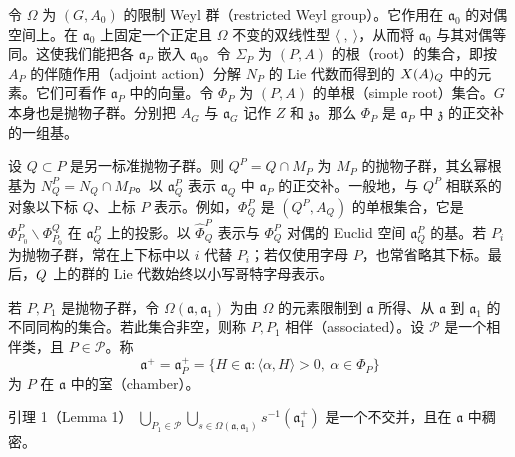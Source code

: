 令 $\Omega$ 为 $(G,A_0)$ 的限制 Weyl 群（restricted Weyl group）。它作用在 $\mathfrak a_0$ 的对偶空间上。在 $\mathfrak a_0$ 上固定一个正定且 $\Omega$ 不变的双线性型 $\langle\ ,\ \rangle$，从而将 $\mathfrak a_0$ 与其对偶等同。这使我们能把各 $\mathfrak a_P$ 嵌入 $\mathfrak a_0$。令 $\Sigma_P$ 为 $(P,A)$ 的根（root）的集合，即按 $A_P$ 的伴随作用（adjoint action）分解 $N_P$ 的 Lie 代数而得到的 $X(A)_Q$ 中的元素。它们可看作 $\mathfrak a_P$ 中的向量。令 $\Phi_P$ 为 $(P,A)$ 的单根（simple root）集合。$G$ 本身也是抛物子群。分别把 $A_G$ 与 $\mathfrak a_G$ 记作 $Z$ 和 $\mathfrak z$。那么 $\Phi_P$ 是 $\mathfrak a_P$ 中 $\mathfrak z$ 的正交补的一组基。

设 $Q\subset P$ 是另一标准抛物子群。则 $Q^P=Q\cap M_P$ 为 $M_P$ 的抛物子群，其幺幂根基为 $N_Q^P=N_Q\cap M_P$。以 $\mathfrak a_Q^P$ 表示 $\mathfrak a_Q$ 中 $\mathfrak a_P$ 的正交补。一般地，与 $Q^P$ 相联系的对象以下标 $Q$、上标 $P$ 表示。例如，$\Phi_Q^P$ 是 $(Q^P,A_Q)$ 的单根集合，它是 $\Phi_{P_0}^P\backslash\Phi_{P_0}^Q$ 在 $\mathfrak a_Q^P$ 上的投影。以 $\widehat\Phi_Q^P$ 表示与 $\Phi_Q^P$ 对偶的 Euclid 空间 $\mathfrak a_Q^P$ 的基。若 $P_i$ 为抛物子群，常在上下标中以 $i$ 代替 $P_i$；若仅使用字母 $P$，也常省略其下标。最后，$Q$ 上的群的 Lie 代数始终以小写哥特字母表示。

若 $P,P_1$ 是抛物子群，令 $\Omega(\mathfrak a,\mathfrak a_1)$ 为由 $\Omega$ 的元素限制到 $\mathfrak a$ 所得、从 $\mathfrak a$ 到 $\mathfrak a_1$ 的不同同构的集合。若此集合非空，则称 $P,P_1$ 相伴（associated）。设 $\mathcal P$ 是一个相伴类，且 $P\in\mathcal P$。称
\[
 \mathfrak a^+=\mathfrak a_P^+=\{H\in\mathfrak a:\langle\alpha,H\rangle>0,\ \alpha\in\Phi_P\}
\]
为 $P$ 在 $\mathfrak a$ 中的室（chamber）。

\begin{originaltheorem}{引理 1（Lemma 1）}
$\displaystyle\bigcup_{P_1\in\mathcal P}\bigcup_{s\in\Omega(\mathfrak a,\mathfrak a_1)}s^{-1}(\mathfrak a_1^+)$ 是一个不交并，且在 $\mathfrak a$ 中稠密。
\end{originaltheorem}

